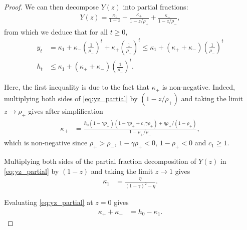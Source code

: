 \documentclass[10pt,a4paper]{amsart}
\begin{document}
\begin{proof}
  We can then decompose $Y(z)$ into partial fractions:
  \begin{align}\label{eq:yz_partial}
    Y(z) = \frac{\kappa_1}{1-z} + \frac{\kappa_+}{1 - z/\rho_+} + \frac{\kappa_-}{1 - z/\rho_-},
  \end{align}
  from which we deduce that for all $t\geqslant 0$,
  \begin{align}
    y_t & = \kappa_1 + \kappa_- \left(\frac{1}{\rho_-}\right)^t + \kappa_+ \left(\frac{1}{\rho_+}\right)^t \leqslant \kappa_1 + (\kappa_+ + \kappa_-)\left(\frac{1}{\rho_-}\right)^t\nonumber\\
    h_t &  \leqslant \kappa_1 + (\kappa_+ + \kappa_-)\left(\frac{1}{\rho_-}\right)^t \label{eq:ht_upper}.
  \end{align}

  Here, the first inequality is due to the fact that $\kappa_+$ is non-negative. Indeed, multiplying both sides of \eqref{eq:yz_partial} by $(1 - z/\rho_+)$ and taking the limit $z \to \rho_+$ gives after simplification
  \begin{align*}
    \kappa_+ & = \frac{h_0(1-\gamma\rho_+)(1-\gamma\rho_+ + c_1\gamma\rho_+) + \eta\rho_+/(1-\rho_+)}{1 - \rho_+/\rho_-},
  \end{align*}
  which is non-negative since $\rho_+ > \rho_-$, $1 - \gamma \rho_+ < 0$, $1 - \rho_+ < 0$ and $c_1 \geqslant 1$.

  Multiplying both sides of the partial fraction decomposition of $Y(z)$ in \eqref{eq:yz_partial} by $(1-z)$ and taking the limit $z \to 1$ gives
  \begin{align}\label{eq:kappa1def}
    \kappa_1 & = \frac{\eta}{(1-\gamma)^2 - \eta}.
  \end{align}

  Evaluating \eqref{eq:yz_partial} at $z=0$ gives
  \begin{align}\label{eq:kappa_plusminus}
    \kappa_+ + \kappa_- & = h_0 - \kappa_1.
  \end{align}


\end{proof}
\end{document}

